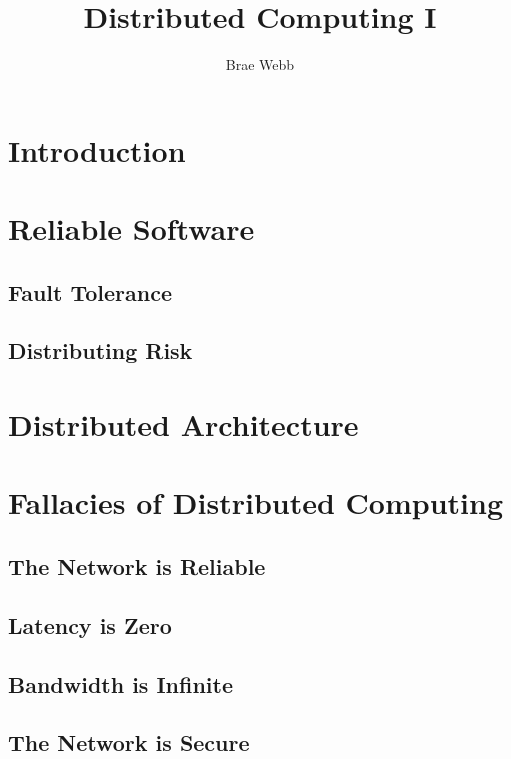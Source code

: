 \title{Distributed Computing I}
\author{Brae Webb}
\date{}

\maketitle

\section{Introduction}

\section{Reliable Software}

\subsection{Fault Tolerance}

\subsection{Distributing Risk}

\section{Distributed Architecture}

\section{Fallacies of Distributed Computing}
\subsection{The Network is Reliable}

\subsection{Latency is Zero}

\subsection{Bandwidth is Infinite}

\subsection{The Network is Secure}

